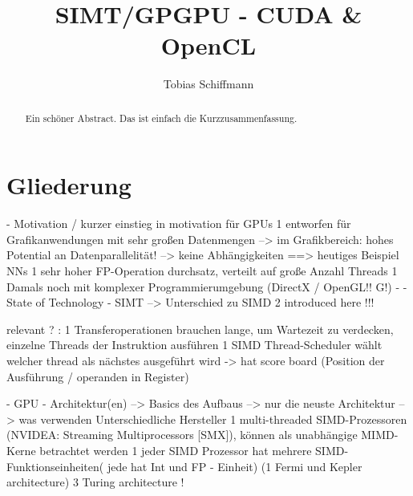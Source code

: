 \documentclass[a4paper,12pt]{llncs}
\numberwithin{equation}{section}
\begin{document}


\author{Tobias Schiffmann}

\title{SIMT/GPGPU - CUDA \& OpenCL}

\maketitle

\thispagestyle{empty}

\begin{abstract}
Ein schöner Abstract. Das ist einfach die Kurzzusammenfassung.
\end{abstract}


\section{Gliederung}
- Motivation / kurzer einstieg in motivation für GPUs
  1 entworfen für Grafikanwendungen mit sehr großen Datenmengen
    --> im Grafikbereich: hohes Potential an Datenparallelität! --> keine Abhängigkeiten
    ==> heutiges Beispiel NNs
  1 sehr hoher FP-Operation durchsatz, verteilt auf große Anzahl Threads
  1 Damals noch mit komplexer Programmierumgebung (DirectX / OpenGL!! G!)
  -   
- State of Technology
  - SIMT
    --> Unterschied zu SIMD    
    2 introduced here !!!

relevant ? :    
    1 Transferoperationen brauchen lange, um Wartezeit zu verdecken, einzelne Threads der Instruktion ausführen
    1 SIMD Thread-Scheduler wählt welcher thread als nächstes ausgeführt wird
       -> hat score board (Position der Ausführung / operanden in Register)
       
   
    
  - GPU - Architektur(en)
    --> Basics des Aufbaus
    --> nur die neuste Architektur
    --> was verwenden Unterschiedliche Hersteller
    1 multi-threaded SIMD-Prozessoren (NVIDEA: Streaming Multiprocessors [SMX]), können als unabhängige MIMD-Kerne betrachtet werden
    1 jeder SIMD Prozessor hat mehrere SIMD-Funktionseinheiten( jede hat Int und FP - Einheit)
    (1 Fermi und Kepler architecture)
    3 Turing architecture !
\end{document}
